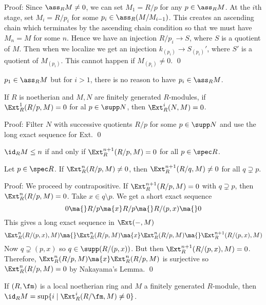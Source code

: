 \noindent Proof: Since $\ass_R M \neq 0$, we can set $M_1=R/p$ for any $p \in \ass_R M$. At the $i$th stage, set $M_i=R/p_i$ for some $p_i \in \ass_R(M/M_{i-1})$. This creates an ascending chain which terminates by the ascending chain condition so that we must have $M_n=M$ for some $n$. Hence we have an injection $R/p_i \to S$, where $S$ is a quotient of $M$. Then when we localize we get an injection $k_{(p_i)} \to S_{(p_i)}'$, where $S'$ is a quotient of $M_{(p_i)}$. This cannot happen if $M_{(p_i)} \neq 0$. \qed \\

\begin{rem}
$p_1 \in \ass_R M$ but for $i>1$, there is no reason to have $p_i \in \ass_R M$. 
\end{rem}

\begin{prop}
If $R$ is noetherian and $M,N$ are finitely generated $R$-modules, if $\Ext_R^1(R/p,M)=0$ for al $p \in \supp N$, then $\Ext_R^i(N,M)=0$.
\end{prop}

\noindent Proof: Filter $N$ with successive quotients $R/p$ for some $p \in \supp N$ and use the long exact sequence for Ext. \qed \\

\begin{cor}
$\id_R M \leq n$ if and only if $\Ext_R^{n+1}(R/p,M)=0$ for all $p \in \spec R$. 
\end{cor}

\begin{lem}
Let $p \in \spec R$. If $\Ext_R^n(R/p,M) \neq 0$, then $\Ext_R^{n+1}(R/q,M) \neq 0$ for all $q \supsetneq p$.
\end{lem}

\noindent Proof: We proceed by contrapositive. If $\Ext_R^{n+1}(R/p,M)=0$ with $q \supsetneq p$, then $\Ext_R^n(R/p,M)=0$. Take $x \in q \setminus p$. We get a short exact sequence
\[
0 \ma{} R/p \ma{x} R/p \ma{} R/(p,x) \ma{} 0
\]
This gives a long exact sequence in $\Ext(-,M)$
\[
\Ext_R^n(R/(p,x),M) \ma{} \Ext_R^n(R/p,M) \ma{x} \Ext_R^n(R/p,M) \ma{} \Ext_R^{n+1}(R/(p,x),M)
\]
Now $q \supsetneq (p,x)$ so $q \in \supp(R/(p,x))$. But then $\Ext_R^{n+1}(R/(p,x),M)=0$. Therefore, $\Ext_R^n(R/p,M) \ma{x} \Ext_R^n(R/p,M)$ is surjective so $\Ext_R^n(R/p,M)=0$ by Nakayama's Lemma. \qed \\

\begin{prop}
If $(R,\fm)$ is a local noetherian ring and $M$ a finitely generated $R$-module, then $\id_R M=\sup\{i\;|\; \Ext_R^i(R/\fm,M) \neq 0\}$.
\end{prop}

